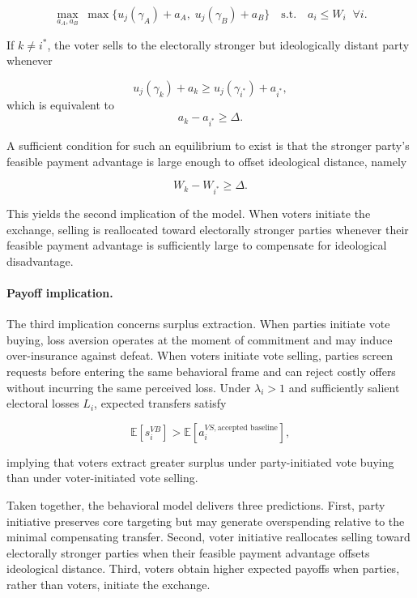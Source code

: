 \documentclass[11pt]{article}
\begin{document}
\begin{equation}
\max_{a_A,a_B}\; \max\{u_j(\gamma_A)+a_A,\;u_j(\gamma_B)+a_B\}
\quad\text{s.t.}\quad
a_i\leq W_i \;\; \forall i.
\end{equation}

If $k\neq i^\ast$, the voter sells to the electorally stronger but ideologically distant party whenever

\begin{equation}
u_j(\gamma_k)+a_k\geq u_j(\gamma_{i^\ast})+a_{i^\ast},
\end{equation}
which is equivalent to
\begin{equation}
a_k-a_{i^\ast}\geq \Delta.
\end{equation}

A sufficient condition for such an equilibrium to exist is that the stronger party's feasible payment advantage is large enough to offset ideological distance, namely

\begin{equation}
W_k-W_{i^\ast}\geq \Delta.
\end{equation}

This yields the second implication of the model. When voters initiate the exchange, selling is reallocated toward electorally stronger parties whenever their feasible payment advantage is sufficiently large to compensate for ideological disadvantage.

\paragraph{Payoff implication.}

The third implication concerns surplus extraction. When parties initiate vote buying, loss aversion operates at the moment of commitment and may induce over-insurance against defeat. When voters initiate vote selling, parties screen requests before entering the same behavioral frame and can reject costly offers without incurring the same perceived loss. Under $\lambda_i>1$ and sufficiently salient electoral losses $L_i$, expected transfers satisfy

\begin{equation}
\mathbb{E}[s_i^{VB}]>\mathbb{E}[a_i^{VS,\text{accepted baseline}}],
\end{equation}

implying that voters extract greater surplus under party-initiated vote buying than under voter-initiated vote selling.

Taken together, the behavioral model delivers three predictions. First, party initiative preserves core targeting but may generate overspending relative to the minimal compensating transfer. Second, voter initiative reallocates selling toward electorally stronger parties when their feasible payment advantage offsets ideological distance. Third, voters obtain higher expected payoffs when parties, rather than voters, initiate the exchange.
\end{document}
